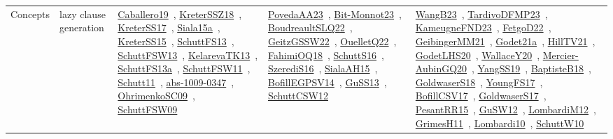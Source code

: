 {\begin{longtable}{lp{3cm}>{\raggedright\arraybackslash}p{6cm}>{\raggedright\arraybackslash}p{6cm}>{\raggedright\arraybackslash}p{8cm}}
Concepts & lazy clause generation & \href{works/Caballero19.pdf}{Caballero19}~\cite{Caballero19}, \href{works/KreterSSZ18.pdf}{KreterSSZ18}~\cite{KreterSSZ18}, \href{works/KreterSS17.pdf}{KreterSS17}~\cite{KreterSS17}, \href{works/Siala15a.pdf}{Siala15a}~\cite{Siala15a}, \href{works/KreterSS15.pdf}{KreterSS15}~\cite{KreterSS15}, \href{works/SchuttFS13.pdf}{SchuttFS13}~\cite{SchuttFS13}, \href{works/SchuttFSW13.pdf}{SchuttFSW13}~\cite{SchuttFSW13}, \href{works/KelarevaTK13.pdf}{KelarevaTK13}~\cite{KelarevaTK13}, \href{works/SchuttFS13a.pdf}{SchuttFS13a}~\cite{SchuttFS13a}, \href{works/SchuttFSW11.pdf}{SchuttFSW11}~\cite{SchuttFSW11}, \href{works/Schutt11.pdf}{Schutt11}~\cite{Schutt11}, \href{works/abs-1009-0347.pdf}{abs-1009-0347}~\cite{abs-1009-0347}, \href{works/OhrimenkoSC09.pdf}{OhrimenkoSC09}~\cite{OhrimenkoSC09}, \href{works/SchuttFSW09.pdf}{SchuttFSW09}~\cite{SchuttFSW09} & \href{works/PovedaAA23.pdf}{PovedaAA23}~\cite{PovedaAA23}, \href{works/Bit-Monnot23.pdf}{Bit-Monnot23}~\cite{Bit-Monnot23}, \href{works/BoudreaultSLQ22.pdf}{BoudreaultSLQ22}~\cite{BoudreaultSLQ22}, \href{works/GeitzGSSW22.pdf}{GeitzGSSW22}~\cite{GeitzGSSW22}, \href{works/OuelletQ22.pdf}{OuelletQ22}~\cite{OuelletQ22}, \href{works/FahimiOQ18.pdf}{FahimiOQ18}~\cite{FahimiOQ18}, \href{works/SchuttS16.pdf}{SchuttS16}~\cite{SchuttS16}, \href{works/SzerediS16.pdf}{SzerediS16}~\cite{SzerediS16}, \href{works/SialaAH15.pdf}{SialaAH15}~\cite{SialaAH15}, \href{works/BofillEGPSV14.pdf}{BofillEGPSV14}~\cite{BofillEGPSV14}, \href{works/GuSS13.pdf}{GuSS13}~\cite{GuSS13}, \href{works/SchuttCSW12.pdf}{SchuttCSW12}~\cite{SchuttCSW12} & \href{works/WangB23.pdf}{WangB23}~\cite{WangB23}, \href{works/TardivoDFMP23.pdf}{TardivoDFMP23}~\cite{TardivoDFMP23}, \href{works/KameugneFND23.pdf}{KameugneFND23}~\cite{KameugneFND23}, \href{works/FetgoD22.pdf}{FetgoD22}~\cite{FetgoD22}, \href{works/GeibingerMM21.pdf}{GeibingerMM21}~\cite{GeibingerMM21}, \href{works/Godet21a.pdf}{Godet21a}~\cite{Godet21a}, \href{works/HillTV21.pdf}{HillTV21}~\cite{HillTV21}, \href{works/GodetLHS20.pdf}{GodetLHS20}~\cite{GodetLHS20}, \href{works/WallaceY20.pdf}{WallaceY20}~\cite{WallaceY20}, \href{works/Mercier-AubinGQ20.pdf}{Mercier-AubinGQ20}~\cite{Mercier-AubinGQ20}, \href{works/YangSS19.pdf}{YangSS19}~\cite{YangSS19}, \href{works/BaptisteB18.pdf}{BaptisteB18}~\cite{BaptisteB18}, \href{works/GoldwaserS18.pdf}{GoldwaserS18}~\cite{GoldwaserS18}, \href{works/YoungFS17.pdf}{YoungFS17}~\cite{YoungFS17}, \href{works/BofillCSV17.pdf}{BofillCSV17}~\cite{BofillCSV17}, \href{works/GoldwaserS17.pdf}{GoldwaserS17}~\cite{GoldwaserS17}, \href{works/PesantRR15.pdf}{PesantRR15}~\cite{PesantRR15}, \href{works/GuSW12.pdf}{GuSW12}~\cite{GuSW12}, \href{works/LombardiM12.pdf}{LombardiM12}~\cite{LombardiM12}, \href{works/GrimesH11.pdf}{GrimesH11}~\cite{GrimesH11}, \href{works/Lombardi10.pdf}{Lombardi10}~\cite{Lombardi10}, \href{works/SchuttW10.pdf}{SchuttW10}~\cite{SchuttW10}\\

\end{longtable}}
